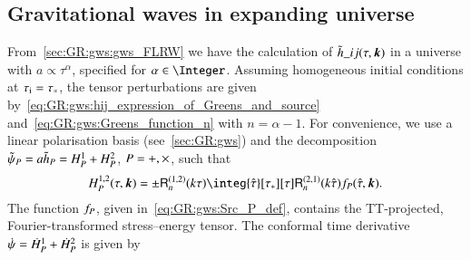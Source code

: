 \subsection{Gravitational waves in expanding universe}
    From~\cref{sec:GR:gws:gws_FLRW} we have the calculation of $\tilde{h}\_{ij}(\tau, \boldsymbol{k})$ in a universe with $a\propto \tau^\alpha$, specified for ${\alpha\in\Integer}$. Assuming homogeneous initial conditions at $\tau_\mathrm{i}=\tau_\ast$, the tensor perturbations are given by~\cref{eq:GR:gws:hij_expression_of_Greens_and_source} and~\cref{eq:GR:gws:Greens_function_n} with $n=\alpha-1$. For convenience, we use a linear polarisation basis (see~\cref{sec:GR:gws}) and the decomposition $\tilde{\psi}_P = a\tilde{h}_P=H^{1}_P + H^2_P $, $P=+, \times$, such that~\citep{kawasakiStudyGravitationalRadiation2011}
    \begin{equation}\label{eq:pertwalls:gws:H_P_12}
        H_P^{1,2}(\tau, \vec{k}) = \pm\mathsf{R}^{(1,2)}_n(k\tau) \integ{\dummy{\tau}}[\tau_\ast][\tau]  \mathsf{R}^{(2,1)}_n(k\dummy{\tau})  \Src_P(\dummy{\tau}, \vec{k}).
    \end{equation}
    The function $f_P$, given in~\cref{eq:GR:gws:Src_P_def},
    contains the TT-projected, Fourier-transformed stress--energy tensor. The conformal time derivative $\dot{\psi} = \dot{H}^1_P + \dot{H}^2_P $ is given by
